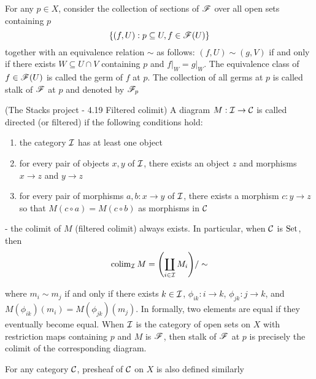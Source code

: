 \begin{definition}
	For any $p \in X$, consider the collection of sections of $\mathscr{F}$ over all open sets containing $p$
	$$
		\{(f, U): p \subseteq U, f \in \mathscr{F}(U)\}
	$$
	together with an equivalence relation $\sim$ as follows: $(f, U) \sim (g, V)$ if and only if there exists $W \subseteq U \cap V$ containing $p$ and $f\vert_W = g\vert_W$. The equivalence class of $f \in \mathscr{F}(U)$ is called the germ of $f$ at $p$. The collection of all germs at $p$ is called stalk of $\mathscr{F}$ at $p$ and denoted by $\mathscr{F}_p$
\end{definition}

\begin{remark}
	(The Stacks project - 4.19 Filtered colimit) A diagram $M: \mathcal{I} \to \mathcal{C}$ is called directed (or filtered) if the following conditions hold:
	\begin{enumerate}
		\item the category $\mathcal{I}$ has at least one object
		\item for every pair of objects $x, y$ of $\mathcal{I}$, there exists an object $z$ and morphisms $x \to z$ and $y \to z$
		\item for every pair of morphisms $a, b: x \to y$ of $\mathcal{I}$, there exists a morphism $c: y \to z$ so that $M(c \circ a) = M(c \circ b)$ as morphisms in $\mathcal{C}$ 
	\end{enumerate}
	
	 - the colimit of $M$ (filtered colimit) always exists. In particular, when $\mathcal{C}$ is $\operatorname{Set}$, then
	$$
		\colim_{\mc{I}} M = \tuple*{\coprod_{i \in \mc{I}} M_i} / \sim
	$$
	
	where $m_i \sim m_j$ if and only if there exists $k \in \mathcal{I}$, $\phi_{ik}: i \to k$, $\phi_{jk}: j \to k$, and $M(\phi_{ik})(m_i) = M(\phi_{jk})(m_j)$. In formally, two elements are equal if they eventually become equal. When $\mathcal{I}$ is the category of open sets on $X$ with restriction maps containing $p$ and $M$ is $\mathscr{F}$, then stalk of $\mathscr{F}$ at $p$ is precisely the colimit of the corresponding diagram.
\end{remark}

\begin{remark}
	For any category $\mathcal{C}$, presheaf of $\mathcal{C}$ on $X$ is also defined similarly
\end{remark}

